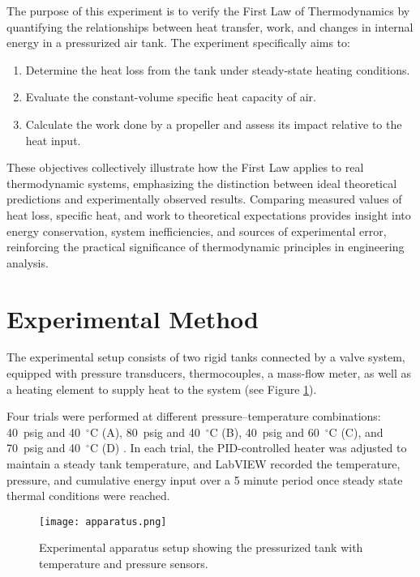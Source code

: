 \documentclass[12pt]{article}
\begin{document}
The purpose of this experiment is to verify the First Law of Thermodynamics by quantifying the relationships between heat transfer, work, and changes in internal energy in a pressurized air tank. The experiment specifically aims to:
\begin{enumerate}
    \item Determine the heat loss from the tank under steady-state heating conditions.
    \item Evaluate the constant-volume specific heat capacity of air.
    \item Calculate the work done by a propeller and assess its impact relative to the heat input.
\end{enumerate}

These objectives collectively illustrate how the First Law applies to real thermodynamic systems, emphasizing the distinction between ideal theoretical predictions and experimentally observed results. Comparing measured values of heat loss, specific heat, and work to theoretical expectations provides insight into energy conservation, system inefficiencies, and sources of experimental error, reinforcing the practical significance of thermodynamic principles in engineering analysis.


\section*{Experimental Method}
The experimental setup consists of two rigid tanks connected by a valve system, equipped with pressure transducers, thermocouples, a mass-flow meter, as well as a heating element to supply heat to the system (see Figure \ref{fig:apparatus}).

Four trials were performed at different pressure–temperature combinations: 40~psig and 40~$^{\circ}$C (A), 80~psig and 40~$^{\circ}$C (B), 40~psig and 60~$^{\circ}$C (C), and 70~psig and 40~$^{\circ}$C (D) \cite{che260_manual}. In each trial, the PID-controlled heater was adjusted to maintain a steady tank temperature, and LabVIEW recorded the temperature, pressure, and cumulative energy input over a 5 minute period once steady state thermal conditions were reached.

\begin{figure}[H]
    \centering
    \texttt{[image: apparatus.png]}
    \caption{Experimental apparatus setup showing the pressurized tank with temperature and pressure sensors.}
    \label{fig:apparatus}
\end{figure}
\end{document}
